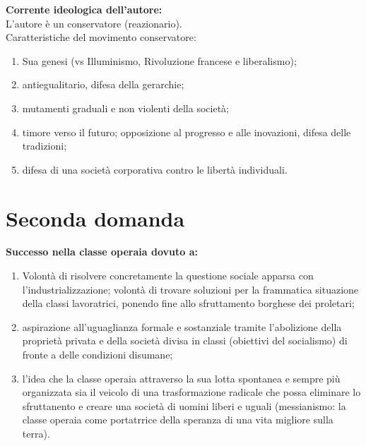 \documentclass[a4paper]{article}
\begin{document}
\textbf{Corrente ideologica dell'autore:} \\
L'autore è un conservatore (reazionario). \\
Caratteristiche del movimento conservatore:
\begin{enumerate}
    \item Sua genesi (vs Illuminismo, Rivoluzione francese e liberalismo);
    \item antiegualitario, difesa della gerarchie;
    \item mutamenti graduali e non violenti della società;
    \item timore verso il futuro; opposizione al progresso e alle inovazioni, difesa delle tradizioni;
    \item difesa di una società corporativa contro le libertà individuali.
\end{enumerate}

\section{Seconda domanda}

\textbf{Successo nella classe operaia dovuto a:}
\begin{enumerate}
    \item Volontà di risolvere concretamente la questione sociale apparsa con l'industrializzazione; volontà di trovare soluzioni per la frammatica situazione della classi lavoratrici, ponendo fine allo sfruttamento borghese dei proletari;
    \item aspirazione all'uguaglianza formale e sostanziale tramite l'abolizione della proprietà privata e della società divisa in classi (obiettivi del socialismo) di fronte a delle condizioni disumane;
    \item l'idea che la classe operaia attraverso la sua lotta spontanea e sempre più organizzata sia il veicolo di una trasformazione radicale che possa eliminare lo sfruttanento e creare una società di uomini liberi e uguali (messianismo: la classe operaia come portatrrice della speranza di una vita migliore sulla terra).
\end{enumerate}
\end{document}

